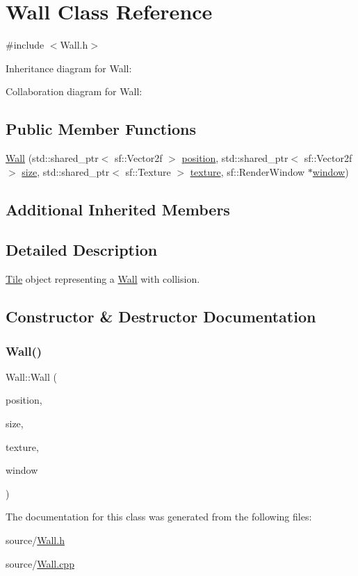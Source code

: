 \hypertarget{classWall}{}\section{Wall Class Reference}
\label{classWall}


{\ttfamily \#include $<$Wall.\+h$>$}



Inheritance diagram for Wall\+:


Collaboration diagram for Wall\+:
\subsection*{Public Member Functions}
\begin{DoxyCompactItemize}
\item 
\hyperlink{classWall_a31b6d4c48c7d25c0e71a1a9cc3ffab5b}{Wall} (std\+::shared\+\_\+ptr$<$ sf\+::\+Vector2f $>$ \hyperlink{classObject_a8b1724482fb412feb64a638038161b7a}{position}, std\+::shared\+\_\+ptr$<$ sf\+::\+Vector2f $>$ \hyperlink{classObject_ac8bfde5d0428d9c091854fe1a09b7d9f}{size}, std\+::shared\+\_\+ptr$<$ sf\+::\+Texture $>$ \hyperlink{classObject_a8ff6491b841d0f48da3d98041fbca934}{texture}, sf\+::\+Render\+Window $\ast$\hyperlink{classObject_a5c6cfc086ea1e39e0b3cf8633a763bf8}{window})
\end{DoxyCompactItemize}
\subsection*{Additional Inherited Members}


\subsection{Detailed Description}
\hyperlink{classTile}{Tile} object representing a \hyperlink{classWall}{Wall} with collision. 

\subsection{Constructor \& Destructor Documentation}
\mbox{\label{classWall_a31b6d4c48c7d25c0e71a1a9cc3ffab5b}} 
\subsubsection{\texorpdfstring{Wall()}{Wall()}}
{\footnotesize\ttfamily Wall\+::\+Wall (\begin{DoxyParamCaption}\item[{std\+::shared\+\_\+ptr$<$ sf\+::\+Vector2f $>$}]{position,  }\item[{std\+::shared\+\_\+ptr$<$ sf\+::\+Vector2f $>$}]{size,  }\item[{std\+::shared\+\_\+ptr$<$ sf\+::\+Texture $>$}]{texture,  }\item[{sf\+::\+Render\+Window $\ast$}]{window }\end{DoxyParamCaption})}



The documentation for this class was generated from the following files\+:\begin{DoxyCompactItemize}
\item 
source/\hyperlink{Wall_8h}{Wall.\+h}\item 
source/\hyperlink{Wall_8cpp}{Wall.\+cpp}\end{DoxyCompactItemize}
